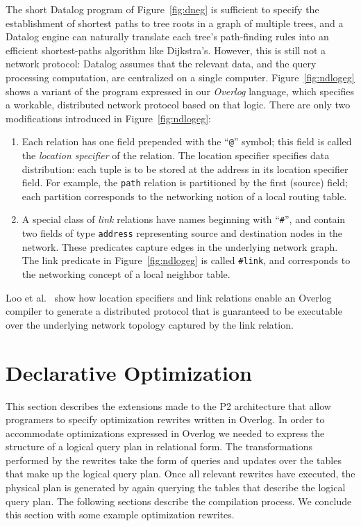 \documentclass{vldb}
\def\link{\texttt{\#link}\xspace}
\def\compactify{\itemsep=0pt \topsep=0pt \partopsep=0pt \parsep=0pt}
\let\latexusecounter=\usecounter
\newenvironment{CompactEnumerate}
   {\def\usecounter{\compactify\latexusecounter}
    \begin{enumerate}}
   {\end{enumerate}\let\usecounter=\latexusecounter}
\begin{document}
The short Datalog program of Figure~\ref{fig:dneg} is sufficient
to specify the establishment of shortest paths to tree roots in a graph of
multiple trees, and a Datalog engine can naturally translate each
tree's path-finding rules into an efficient shortest-paths algorithm
like Dijkstra's.  However, this is still not a network protocol:
Datalog assumes that the relevant data, and the query processing
computation, are centralized on a single computer.
Figure~\ref{fig:ndlogeg} shows a variant of the program expressed in
our {\em Overlog} language, which specifies a workable,
distributed network protocol based on that logic.  There are only two
modifications introduced in Figure~\ref{fig:ndlogeg}:
\begin{CompactEnumerate}
\item Each relation has one field prepended with
   the ``{\tt @}'' symbol; this field is called the {\em location specifier}
of the relation.  The location specifier specifies data distribution:
each tuple is to be stored at the address in its location
specifier field.  For example, the {\tt path} relation is partitioned
by the first (source) field; each partition corresponds to the
networking notion of a local routing table.
\item A special class of {\em link} relations have names beginning
  with ``{\tt \#}'', and contain two fields of type {\tt address}
  representing source and destination nodes in the network. These
  predicates capture edges in the underlying network graph.
  The link predicate in Figure~\ref{fig:ndlogeg} is called
  \texttt{\link}, and corresponds to the networking concept of a local
  neighbor table.
\end{CompactEnumerate}
Loo et al.~\cite{loo-sigmod06} show how location specifiers and link
relations enable an Overlog compiler to generate a distributed
protocol that is guaranteed to be executable over the
underlying network topology captured by the link relation.



\section{Declarative Optimization}

This section describes the extensions made to the P2 architecture that
allow programers to specify
optimization rewrites written in Overlog. In order to accommodate 
optimizations expressed in Overlog we needed to express the structure
of a logical query plan in relational form. The transformations performed
by the rewrites take the form of queries and updates over the tables
that make up the logical query plan. Once all relevant rewrites have 
executed, the physical plan is generated by again querying the tables
that describe the logical query plan. The following sections describe the
compilation process. We conclude this section with some example 
optimization rewrites.
\end{document}
